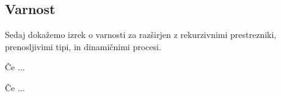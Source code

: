 %
%
%
%
%	
%
%
%



\subsection{Varnost}

Sedaj dokažemo izrek o varnosti za \lae{} razširjen z rekurzivnimi prestrezniki, prenosljivimi tipi, in dinamičnimi procesi.

\begin{izrek}
	Če ...
\end{izrek}



\begin{izrek}
	Če ...
\end{izrek}



